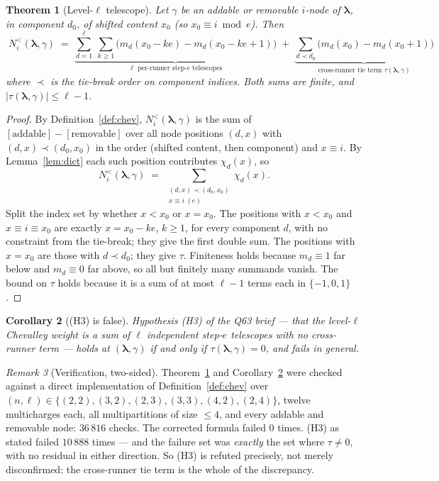 \documentclass[11pt]{article}
\newtheorem{theorem}{Theorem}[section]
\newtheorem{corollary}[theorem]{Corollary}
\theoremstyle{definition}
\theoremstyle{remark}
\newtheorem{remark}[theorem]{Remark}
\newcommand{\bl}{\boldsymbol{\lambda}}
\newcommand{\Nlt}{N^{<}}
\begin{document}
\begin{theorem}[Level-$\ell$ telescope]\label{thm:tele}
Let $\gamma$ be an addable or removable $i$-node of $\bl$, in component $d_0$, of
shifted content $x_0$ (so $x_0\equiv i \bmod e$). Then
\[
\boxed{\;
\Nlt_i(\bl,\gamma)\;=\;
\underbrace{\sum_{d=1}^{\ell}\ \sum_{k\ge1}\Big(m_d(x_0-ke)-m_d(x_0-ke+1)\Big)}_{\text{$\ell$ per-runner step-$e$ telescopes}}
\;+\;
\underbrace{\sum_{d\prec d_0}\Big(m_d(x_0)-m_d(x_0+1)\Big)}_{\text{cross-runner tie term }\tau(\bl,\gamma)}\;}
\]
where $\prec$ is the tie-break order on component indices. Both sums are finite, and
$|\tau(\bl,\gamma)|\le\ell-1$.
\end{theorem}

\begin{proof}
By Definition~\ref{def:chev}, $\Nlt_i(\bl,\gamma)$ is the sum of
$[\text{addable}]-[\text{removable}]$ over all node positions $(d,x)$ with
$(d,x)\prec(d_0,x_0)$ in the order (shifted content, then component) and $x\equiv i$.
By Lemma~\ref{lem:dict} each such position contributes $\chi_d(x)$, so
\[
\Nlt_i(\bl,\gamma)\;=\;\sum_{\substack{(d,x)\prec(d_0,x_0)\\ x\equiv i\ (e)}}\chi_d(x).
\]
Split the index set by whether $x<x_0$ or $x=x_0$. The positions with $x<x_0$ and
$x\equiv i\equiv x_0$ are exactly $x=x_0-ke$, $k\ge1$, for every component $d$, with no
constraint from the tie-break; they give the first double sum. The positions with
$x=x_0$ are those with $d\prec d_0$; they give $\tau$. Finiteness holds because
$m_d\equiv1$ far below and $m_d\equiv0$ far above, so all but finitely many summands
vanish. The bound on $\tau$ holds because it is a sum of at most $\ell-1$ terms each in
$\{-1,0,1\}$.
\end{proof}

\begin{corollary}[(H3) is false]\label{cor:H3}
Hypothesis (H3) of the Q63 brief --- that the level-$\ell$ Chevalley weight is a sum of
$\ell$ independent step-$e$ telescopes with no cross-runner term --- holds at
$(\bl,\gamma)$ if and only if $\tau(\bl,\gamma)=0$, and fails in general.
\end{corollary}

\begin{remark}[Verification, two-sided]\label{rem:verif-tele}
Theorem~\ref{thm:tele} and Corollary~\ref{cor:H3} were checked against a direct
implementation of Definition~\ref{def:chev} over $(n,\ell)\in\{(2,2),(3,2),(2,3),(3,3),
(4,2),(2,4)\}$, twelve multicharges each, all multipartitions of size $\le4$, and every
addable and removable node: $36\,816$ checks. The corrected formula failed $0$ times.
(H3) as stated failed $10\,888$ times --- and the failure set was \emph{exactly} the set
where $\tau\neq0$, with no residual in either direction. So (H3) is refuted precisely,
not merely disconfirmed: the cross-runner tie term is the whole of the discrepancy.
\end{remark}
\end{document}
